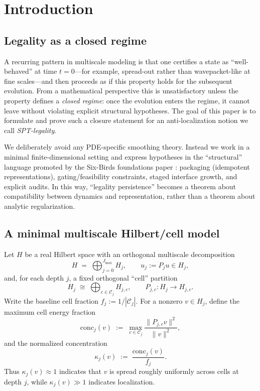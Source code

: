 \documentclass[11pt]{article}
\begin{document}
\section{Introduction}\label{sec:intro}

\subsection{Legality as a closed regime}

A recurring pattern in multiscale modeling is that one certifies a state as ``well-behaved'' at time $t=0$---for example, spread-out rather than wavepacket-like at fine scales---and then proceeds as if this property holds for the subsequent evolution.
From a mathematical perspective this is unsatisfactory unless the property defines a \emph{closed regime}: once the evolution enters the regime, it cannot leave without violating explicit structural hypotheses.
The goal of this paper is to formulate and prove such a closure statement for an anti-localization notion we call \emph{SPT-legality}.

We deliberately avoid any PDE-specific smoothing theory.
Instead we work in a minimal finite-dimensional setting and express hypotheses in the ``structural'' language promoted by the Six-Birds foundations paper \cite{Tsiokos2026SixBirds}:
packaging (idempotent representations), gating/feasibility constraints, staged interface growth, and explicit audits.
In this way, ``legality persistence'' becomes a theorem about compatibility between dynamics and representation, rather than a theorem about analytic regularization.

\subsection{A minimal multiscale Hilbert/cell model}

Let $H$ be a real Hilbert space with an orthogonal multiscale decomposition
\[
H \;=\; \bigoplus_{j=0}^{J_{\max}} H_j,
\qquad u_j := P_j u \in H_j,
\]
and, for each depth $j$, a fixed orthogonal ``cell'' partition
\[
H_j \;\cong\; \bigoplus_{c\in \mathcal C_j} H_{j,c},
\qquad P_{j,c}:H_j\to H_{j,c}.
\]
Write the baseline cell fraction $f_j := 1/|\mathcal C_j|$.
For a nonzero $v\in H_j$, define the maximum cell energy fraction
\[
\mathrm{conc}_j(v) \;:=\; \max_{c\in\mathcal C_j}\frac{\|P_{j,c}v\|^2}{\|v\|^2},
\]
and the normalized concentration
\[
\kappa_j(v) \;:=\; \frac{\mathrm{conc}_j(v)}{f_j}.
\]
Thus $\kappa_j(v)\approx 1$ indicates that $v$ is spread roughly uniformly across cells at depth $j$, while $\kappa_j(v)\gg 1$ indicates localization.
\end{document}

